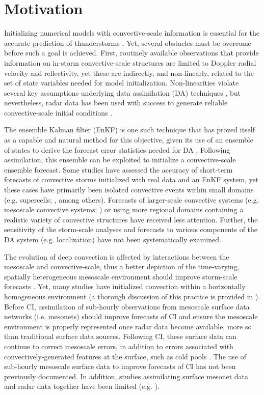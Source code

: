 \chapter{Motivation}
Initializing numerical models with convective-scale information is essential for the accurate prediction of thunderstorms \citep{lilly90}. Yet, several obstacles must be overcome before such a goal is achieved. First, routinely available observations that provide information on in-storm convective-scale structures are limited to Doppler radial velocity and reflectivity, yet these are indirectly, and non-linearly, related to the set of state variables needed for model initialization. Non-linearities violate several key assumptions underlying data assimilation (DA) techniques \citep{kalnaybook}, but nevertheless, radar data has  been used with success to generate reliable convective-scale initial conditions \citep{sun05}.

The ensemble Kalman filter (EnKF) is one such technique that has proved itself as a capable and natural method for this objective, given its use of an ensemble of states to derive the forecast error statistics needed for DA \citep{evensen94,snyderzhang03}. Following assimilation, this ensemble can be exploited to initialize a convective-scale ensemble forecast. Some studies have assessed the accuracy of short-term forecasts of convective storms initialized with real data and an EnKF system, yet these cases have primarily been isolated convective events within small domains (e.g. supercells; \citealt{dowellwicker09,dowelletal11,dawsonetal12}, among others). Forecasts of larger-scale convective systems (e.g. mesoscale convective systems; \citealt{wheatleystensrud10,snooketal12}) or using more regional domains containing a realistic variety of convective structures have received less attention. Further, the sensitivity of the storm-scale analyses and forecasts to various components of the DA system (e.g. localization) have not been systematically examined.

The evolution of deep convection is affected by interactions between the mesoscale and convective-scale, thus a better depiction of the time-varying, spatially heterogeneous mesoscale environment should improve storm-scale forecasts \citep{stensrudetal13}. Yet, many studies have initialized convection within a horizontally homogeneous environment (a thorough discussion of this practice is provided in \citealt{dawsonetal12}). Before CI, assimilation of sub-hourly observations from mesoscale surface data networks (i.e. mesonets) should improve forecasts of CI and ensure the mesoscale environment is properly represented once radar data become available, more so than traditional surface data sources. Following CI, these surface data can continue to correct mesoscale errors, in addition to errors associated with convectively-generated features at the surface, such as cold pools \citep{wheatleystensrud10}. The use of sub-hourly mesoscale surface data to improve forecasts of CI has not been previously documented. In addition, studies assimilating surface mesonet data and radar data together have been limited (e.g. \citealt{schenkmanetal11b}).

